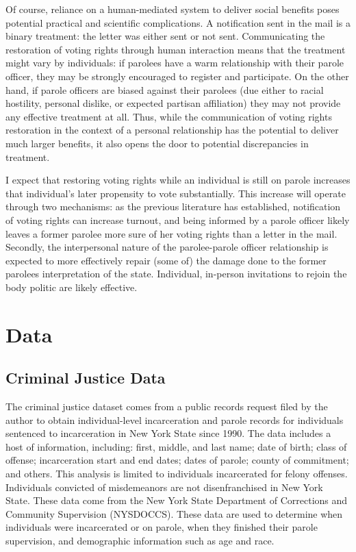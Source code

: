 \documentclass[
  12pt,
]{article}
\begin{document}
Of course, reliance on a human-mediated system to deliver social benefits poses potential practical and scientific complications. A notification sent in the mail is a binary treatment: the letter was either sent or not sent. Communicating the restoration of voting rights through human interaction means that the treatment might vary by individuals: if parolees have a warm relationship with their parole officer, they may be strongly encouraged to register and participate. On the other hand, if parole officers are biased against their parolees (due either to racial hostility, personal dislike, or expected partisan affiliation) they may not provide any effective treatment at all. Thus, while the communication of voting rights restoration in the context of a personal relationship has the potential to deliver much larger benefits, it also opens the door to potential discrepancies in treatment.

I expect that restoring voting rights while an individual is still on parole increases that individual's later propensity to vote substantially. This increase will operate through two mechanisms: as the previous literature has established, notification of voting rights can increase turnout, and being informed by a parole officer likely leaves a former parolee more sure of her voting rights than a letter in the mail. Secondly, the interpersonal nature of the parolee-parole officer relationship is expected to more effectively repair (some of) the damage done to the former parolees interpretation of the state. Individual, in-person invitations to rejoin the body politic are likely effective.

\hypertarget{data}{%
\section*{Data}\label{data}}

\hypertarget{criminal-justice-data}{%
\subsection*{Criminal Justice Data}\label{criminal-justice-data}}

The criminal justice dataset comes from a public records request filed by the author to obtain individual-level incarceration and parole records for individuals sentenced to incarceration in New York State since 1990. The data includes a host of information, including: first, middle, and last name; date of birth; class of offense; incarceration start and end dates; dates of parole; county of commitment; and others. This analysis is limited to individuals incarcerated for felony offenses. Individuals convicted of misdemeanors are not disenfranchised in New York State. These data come from the New York State Department of Corrections and Community Supervision (NYSDOCCS). These data are used to determine when individuals were incarcerated or on parole, when they finished their parole supervision, and demographic information such as age and race.
\end{document}
